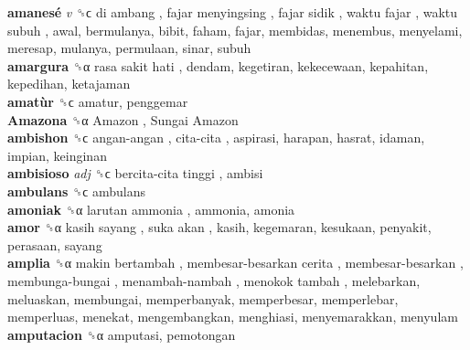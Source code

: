 \textbf{amanesé} \emph{v}  ␝ϲ   di ambang ,  fajar menyingsing ,  fajar sidik ,  waktu fajar ,  waktu subuh , awal, bermulanya, bibit, faham, fajar, membidas, menembus, menyelami, meresap, mulanya, permulaan, sinar, subuh  \\
\textbf{amargura} ␝α   rasa sakit hati , dendam, kegetiran, kekecewaan, kepahitan, kepedihan, ketajaman  \\
\textbf{amatùr} ␝ϲ  amatur, penggemar  \\
\textbf{Amazona} ␝α   Amazon ,  Sungai Amazon   \\
\textbf{ambishon} ␝ϲ   angan-angan ,  cita-cita , aspirasi, harapan, hasrat, idaman, impian, keinginan  \\
\textbf{ambisioso} \emph{adj}  ␝ϲ   bercita-cita tinggi , ambisi  \\
\textbf{ambulans} ␝ϲ  ambulans  \\
\textbf{amoniak} ␝α   larutan ammonia , ammonia, amonia  \\
\textbf{amor} ␝α   kasih sayang ,  suka akan , kasih, kegemaran, kesukaan, penyakit, perasaan, sayang  \\
\textbf{amplia} ␝α   makin bertambah ,  membesar-besarkan cerita ,  membesar-besarkan ,  membunga-bungai ,  menambah-nambah ,  menokok tambah , melebarkan, meluaskan, membungai, memperbanyak, memperbesar, memperlebar, memperluas, menekat, mengembangkan, menghiasi, menyemarakkan, menyulam  \\
\textbf{amputacion} ␝α  amputasi, pemotongan  \\

